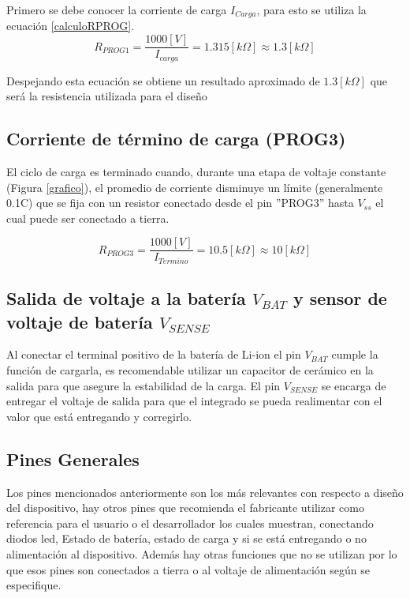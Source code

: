 Primero se debe conocer la corriente de carga $I_{Carga}$, para esto se utiliza la ecuación  \ref{calculoRPROG}.
\begin{equation}\label{calculoRPROG}
R_{PROG1} = \frac{1000[V]}{I_{carga}} = 1.315[k\Omega] \approx 1.3[k\Omega]
\end{equation}

Despejando esta ecuación se obtiene un resultado aproximado de $1.3[k\Omega]$ que será la resistencia utilizada para el diseño

\subsection{Corriente de término de carga (PROG3)}

El ciclo de carga es terminado cuando, durante una etapa de voltaje constante (Figura \ref{grafico}), el promedio de corriente disminuye un límite (generalmente 0.1C) que se fija con un resistor conectado desde el pin ''PROG3'' hasta $V_{ss}$ el cual puede ser conectado a tierra.

\begin{equation}\label{Rprog3}
R_{PROG3} = \frac{1000[V]}{I_{Termino}} = 10.5[k\Omega] \approx 10[k\Omega]
\end{equation}

\subsection{Salida de voltaje a la batería $V_{BAT}$ y sensor de voltaje de batería $V_{SENSE}$}

Al conectar el terminal positivo de la batería de Li-ion el pin  $V_{BAT}$ cumple la función de cargarla, es recomendable utilizar un capacitor de cerámico en la salida para que asegure la estabilidad de la carga. 
El pin $V_{SENSE}$ se encarga de entregar el voltaje de salida para que el integrado se pueda realimentar con el valor que está entregando y corregirlo. 

\subsection{Pines Generales}

Los pines mencionados anteriormente son los más relevantes con respecto a diseño del dispositivo, hay otros pines que recomienda el fabricante utilizar como referencia para el usuario o el desarrollador los cuales muestran, conectando diodos led, Estado de batería, estado de carga y si se está entregando o no alimentación al dispositivo. 
Además hay otras funciones que no se utilizan por lo que esos pines son conectados a tierra o al voltaje de alimentación según se especifique.

